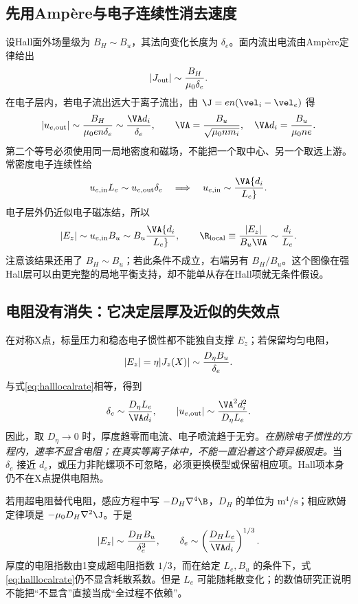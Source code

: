 \subsection{先用Ampère与电子连续性消去速度}
设Hall面外场量级为 $B_H\sim B_u$，其法向变化长度为 $\delta_e$。面内流出电流由Ampère定律给出
\begin{equation}
|J_{\rm out}|\sim{B_H\over\mu_0\delta_e}.
\end{equation}
在电子层内，若电子流出远大于离子流出，由 $\J=en(\vel_i-\vel_e)$ 得
\begin{equation}
|u_{e,\rm out}|\sim{B_H\over\mu_0en\delta_e}
\sim {\VA d_i\over\delta_e},\qquad
\VA={B_u\over\sqrt{\mu_0nm_i}},\quad
\VA d_i={B_u\over\mu_0ne}.
\end{equation}
第二个等号必须使用同一局地密度和磁场，不能把一个取中心、另一个取远上游。常密度电子连续性给
\begin{equation}
u_{e,\rm in}L_e\sim u_{e,\rm out}\delta_e
\quad\Longrightarrow\quad
u_{e,\rm in}\sim\VA{d_i\over L_e}.
\end{equation}
电子层外仍近似电子磁冻结，所以
\begin{equation}
|E_z|\sim u_{e,\rm in}B_u
\sim B_u\VA{d_i\over L_e},\qquad
\R_{\rm local}\equiv{|E_z|\over B_u\VA}\sim {d_i\over L_e}.
\label{eq:halllocalrate}
\end{equation}
注意该结果还用了 $B_H\sim B_u$；若此条件不成立，右端另有 $B_H/B_u$。这个图像在强Hall层可以由更完整的局地平衡支持，却不能单从存在Hall项就无条件假设。

\subsection{电阻没有消失：它决定层厚及近似的失效点}
在对称X点，标量压力和稳态电子惯性都不能独自支撑 $E_z$；若保留均匀电阻，
\begin{equation}
|E_z|=\eta|J_z(X)|\sim {D_\eta B_u\over\delta_e}.
\end{equation}
与式\eqref{eq:halllocalrate}相等，得到
\begin{equation}
\delta_e\sim{D_\eta L_e\over\VA d_i},\qquad
|u_{e,\rm out}|\sim{\VA^2d_i^2\over D_\eta L_e}.
\label{eq:hallthickness}
\end{equation}
因此，取 $D_\eta\to0$ 时，厚度趋零而电流、电子喷流趋于无穷。\emph{在删除电子惯性的方程内，速率不显含电阻；在真实等离子体中，不能一直沿着这个奇异极限走。}当 $\delta_e$ 接近 $d_e$，或压力非陀螺项不可忽略，必须更换模型或保留相应项。Hall项本身仍不在X点提供电阻热。

若用超电阻替代电阻，感应方程中写 $-D_H\nabla^4\B$，$D_H$ 的单位为 $\mathrm{m^4/s}$；相应欧姆定律项是 $-\mu_0D_H\nabla^2\J$。于是
\begin{equation}
|E_z|\sim {D_HB_u\over\delta_e^3},\qquad
\delta_e\sim\left({D_HL_e\over\VA d_i}\right)^{1/3}.
\end{equation}
厚度的电阻指数由1变成超电阻指数 $1/3$，而在给定 $L_e,B_u$ 的条件下，式\eqref{eq:halllocalrate}仍不显含耗散系数。但是 $L_e$ 可能随耗散变化；\citet{Sullivan2009}的数值研究正说明不能把“不显含”直接当成“全过程不依赖”。

